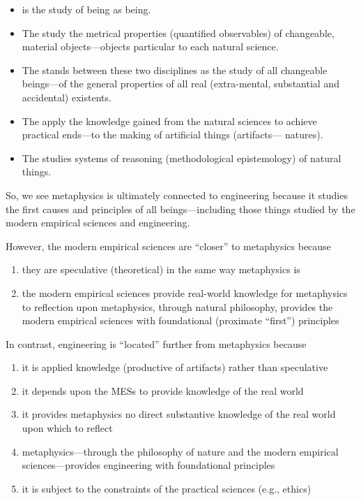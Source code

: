 \begin{itemize}
\item {} is the study of being as being.
\item The  study the metrical properties (quantified observables) of changeable, material objects---objects particular to each natural science.
\item The  stands between these two disciplines as the study of all changeable beings---of the general properties of all real (extra-mental, substantial and accidental) existents.
\item The  apply the knowledge gained from the natural sciences to achieve practical ends---to the making of artificial things (artifacts--- natures).
\item The  studies systems of reasoning (methodological epistemology) of natural things.
\end{itemize}

So, we see metaphysics is ultimately connected to engineering because it studies the first causes and principles of all beings---including those things studied by the modern empirical sciences and engineering.

However, the modern empirical sciences are ``closer'' to metaphysics because

\begin{enumerate}
\item they are speculative (theoretical) in the same way metaphysics is
\item the modern empirical sciences provide real-world knowledge for metaphysics to reflection upon
metaphysics, through natural philosophy, provides the modern empirical sciences with foundational (proximate ``first'') principles
\end{enumerate}

In contrast, engineering is ``located'' further from metaphysics because

\begin{enumerate}
\item it is applied knowledge (productive of artifacts) rather than speculative
\item it depends upon the MESs to provide knowledge of the real world
\item it provides metaphysics no direct substantive knowledge of the real world upon which to reflect
\item metaphysics---through the philosophy of nature and the modern empirical sciences---provides engineering with foundational principles
\item it is subject to the constraints of the practical sciences (e.g., ethics)
\end{enumerate}

